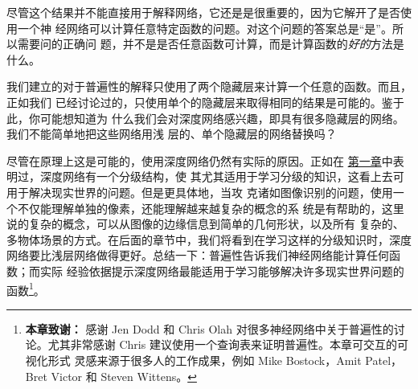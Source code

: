 尽管这个结果并不能直接用于解释网络，它还是是很重要的，因为它解开了是否使用一个神
经网络可以计算任意特定函数的问题。对这个问题的答案总是“是”。所以需要问的正确问
题，并不是是否任意函数可计算，而是计算函数的\emph{好的}方法是什么。

我们建立的对于普遍性的解释只使用了两个隐藏层来计算一个任意的函数。而且，正如我们
已经讨论过的，只使用单个的隐藏层来取得相同的结果是可能的。鉴于此，你可能想知道为
什么我们会对深度网络感兴趣，即具有很多隐藏层的网络。我们不能简单地把这些网络用浅
层的、单个隐藏层的网络替换吗？

尽管在原理上这是可能的，使用深度网络仍然有实际的原因。正如在%
\hyperref[sec:toward_deep_learning]{第一章}中表明过，深度网络有一个分级结构，使
其尤其适用于学习分级的知识，这看上去可用于解决现实世界的问题。但是更具体地，当攻
克诸如图像识别的问题，使用一个不仅能理解单独的像素，还能理解越来越复杂的概念的系
统是有帮助的，这里说的复杂的概念，可以从图像的边缘信息到简单的几何形状，以及所有
复杂的、多物体场景的方式。在后面的章节中，我们将看到在学习这样的分级知识时，深度
网络要比浅层网络做得更好。总结一下：普遍性告诉我们神经网络能计算任何函数；而实际
经验依据提示深度网络最能适用于学习能够解决许多现实世界问题的函数\footnote{
  \textbf{本章致谢：} 感谢 Jen Dodd 和 Chris Olah 对很多神经网络中关于普遍性的讨
  论。尤其非常感谢 Chris 建议使用一个查询表来证明普遍性。本章可交互的可视化形式
  灵感来源于很多人的工作成果，例如 Mike Bostock，Amit Patel，Bret Victor 和
  Steven Wittens。}。
